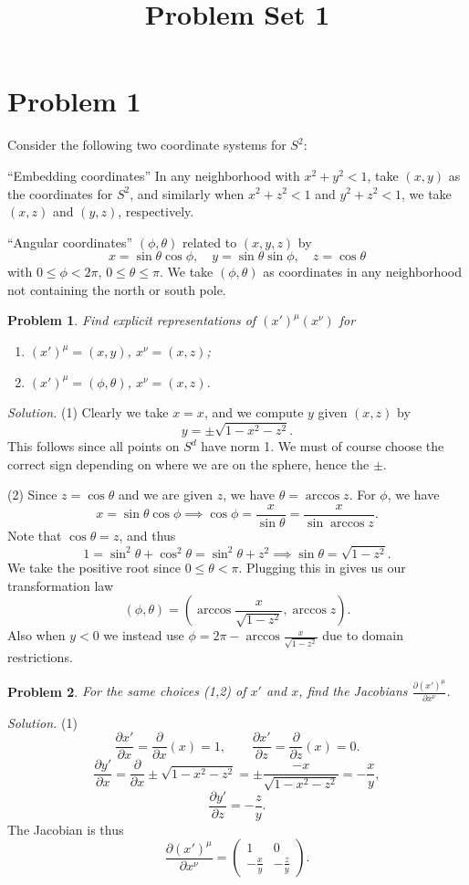 \documentclass[11pt, letterpaper]{article}
\title{Problem Set 1}
\theoremstyle{plain}
\newtheorem{problem}{Problem}[section]
\begin{document}
\makeproblem

\section{Problem 1}

Consider the following two coordinate systems for $S^2$:

``Embedding coordinates'' In any neighborhood with $x^2+y^2<1$, take $(x,y)$ as the coordinates for $S^2$, and similarly when $x^2+z^2<1$ and $y^2+z^2<1$, we take $(x,z)$ and $(y,z)$, respectively.

``Angular coordinates'' $(\phi ,\theta )$ related to $(x,y,z)$ by
\[
	x=\sin \theta \cos \phi ,\quad y=\sin \theta \sin \phi ,\quad z=\cos \theta 
\]
with $0\leq \phi <2\pi $, $0\leq \theta \leq \pi $. We take $(\phi ,\theta )$ as coordinates in any neighborhood not containing the north  or south pole.

\begin{problem}
	Find explicit representations of $(x')^\mu (x^\nu )$ for
	\begin{enumerate}
		\item $(x')^\mu =(x,y)$, $x^\nu =(x,z)$;
		\item $(x')^\mu =(\phi ,\theta )$, $x^\nu =(x,z)$.
	\end{enumerate}
\end{problem}
\noindent\emph{Solution.} (1) Clearly we take $x=x$, and we compute $y$ given $(x,z)$ by
\[
	y=\pm\sqrt{1-x^2-z^2} 
.\]
This follows since all points on $S^d$ have norm 1. We must of course choose the correct sign depending on where we are on the sphere, hence the $\pm$.

(2) Since $z=\cos \theta $ and we are given $z$, we have $\theta =\arccos z$. For $\phi $, we have
\[
	x=\sin \theta \cos \phi \implies \cos \phi =\frac{x}{\sin \theta } =\frac{x}{\sin \arccos z} 
.\]
Note that $\cos \theta =z$, and thus
\[
	1=\sin ^2\theta +\cos ^2\theta =\sin ^2\theta +z^2 \implies \sin \theta =\sqrt{1-z^2} 
.\]
We take the positive root since $0\leq \theta <\pi $. Plugging this in gives us our transformation law
\[
	(\phi ,\theta )=\left( \arccos \frac{x}{\sqrt{1-z^2} } ,\arccos z \right) 
.\]
Also when $y<0$ we instead use $\phi  =2\pi -\arccos \frac{x}{\sqrt{1-z^2}} $ due to domain restrictions.

\begin{problem}
	For the same choices (1,2) of $x'$ and $x$, find the Jacobians $\frac{\partial (x')^\mu }{\partial x^\nu } $.
\end{problem}
\noindent \emph{Solution.} (1)
\[
	\frac{\partial x'}{\partial x} =\frac{\partial }{\partial x} (x)=1,\qquad \frac{\partial x'}{\partial z} =\frac{\partial }{\partial z} (x)=0
.\]
\[
	\frac{\partial y'}{\partial x} =\frac{\partial }{\partial x}\pm \sqrt{1-x^2-z^2} =\pm\frac{-x}{\sqrt{1-x^2-z^2} } =-\frac{x}{y} ,
\]
\[
	\frac{\partial y'}{\partial z} =-\frac{z}{y} 
.\]
The Jacobian is thus
\[
	\frac{\partial (x')^\mu }{\partial x^\nu } =\begin{pmatrix}
	1 & 0 \\
	-\frac{x}{y}  & -\frac{z}{y} 
	\end{pmatrix}
.\]
\end{document}
